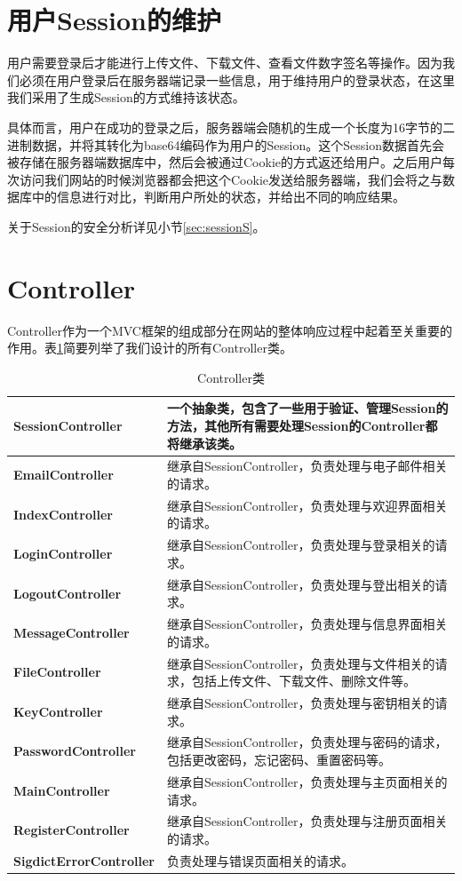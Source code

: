 \section{用户Session的维护}

用户需要登录后才能进行上传文件、下载文件、查看文件数字签名等操作。因为我们必须在用户登录后在服务器端记录一些信息，用于维持用户的登录状态，在这里我们采用了生成Session的方式维持该状态。

具体而言，用户在成功的登录之后，服务器端会随机的生成一个长度为16字节的二进制数据，并将其转化为base64编码\cite{base64}作为用户的Session。这个Session数据首先会被存储在服务器端数据库中，然后会被通过Cookie\cite{cookie}的方式返还给用户。之后用户每次访问我们网站的时候浏览器都会把这个Cookie发送给服务器端，我们会将之与数据库中的信息进行对比，判断用户所处的状态，并给出不同的响应结果。

关于Session的安全分析详见小节\ref{sec:sessionS}。

\section{Controller}\label{sec:controllerP}

Controller作为一个MVC框架的组成部分在网站的整体响应过程中起着至关重要的作用。表\ref{tab:controller}简要列举了我们设计的所有Controller类。

\begin{table}[ht]
\centering
\begin{tabular}{>{\bfseries}lp{9cm}}
\toprule
SessionController & 
一个抽象类，包含了一些用于验证、管理Session的方法，其他所有需要处理Session的Controller都将继承该类。\\
\midrule
EmailController & 
继承自SessionController，负责处理与电子邮件相关的请求。\\
\midrule
IndexController & 
继承自SessionController，负责处理与欢迎界面相关的请求。\\
\midrule
LoginController &
继承自SessionController，负责处理与登录相关的请求。\\
\midrule
LogoutController &
继承自SessionController，负责处理与登出相关的请求。\\
\midrule
MessageController &
继承自SessionController，负责处理与信息界面相关的请求。\\
\midrule
FileController &
继承自SessionController，负责处理与文件相关的请求，包括上传文件、下载文件、删除文件等。\\
\midrule
KeyController &
继承自SessionController，负责处理与密钥相关的请求。\\
\midrule
PasswordController &
继承自SessionController，负责处理与密码的请求，包括更改密码，忘记密码、重置密码等。\\
\midrule
MainController &
继承自SessionController，负责处理与主页面相关的请求。\\
\midrule
RegisterController &
继承自SessionController，负责处理与注册页面相关的请求。\\
\midrule
SigdictErrorController &
负责处理与错误页面相关的请求。\\
\bottomrule
\end{tabular}
\caption{Controller类}
\label{tab:controller}
\end{table}

